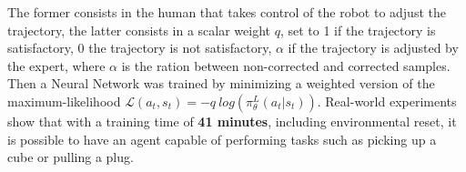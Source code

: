 The former consists in the human that takes control of the robot to adjust the trajectory, the latter consists in a scalar weight $q$, set to 1 if the trajectory is satisfactory, 0 the trajectory is not satisfactory, $\alpha$ if the trajectory is adjusted by the expert, where $\alpha$ is the ration between non-corrected and corrected samples. Then a Neural Network %
was trained by minimizing a weighted version of the maximum-likelihood $\mathcal{L}(a_{t},s_{t}) = - q \ log(\pi^{L}_{\theta}(a_{t}|s_{t}))$. Real-world experiments show that with a training time of \textbf{41 minutes}, including environmental reset, it is possible to have an agent capable of performing tasks such as picking up a cube or pulling a plug.
%

